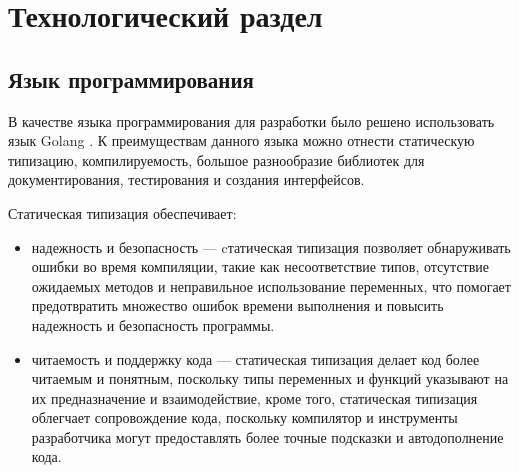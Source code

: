 \chapter{Технологический раздел}


\section{Язык программирования}

В качестве языка программирования для разработки  было решено использовать язык Golang \cite{golang}. К преимуществам данного языка можно отнести статическую типизацию, компилируемость, большое
разнообразие библиотек для документирования, тестирования и создания интерфейсов.

\begin{flushleft}
Статическая типизация обеспечивает:
\end{flushleft}
\begin{itemize}
\item надежность и безопасность --- cтатическая типизация позволяет обнаруживать ошибки во время компиляции, такие как несоответствие типов, отсутствие ожидаемых методов и неправильное использование переменных, что помогает предотвратить множество ошибок времени выполнения и повысить надежность и безопасность программы.

\item читаемость и поддержку кода --- статическая типизация делает код более читаемым и понятным, поскольку типы переменных и функций указывают на их предназначение и взаимодействие, кроме того, статическая типизация облегчает сопровождение кода, поскольку компилятор и инструменты разработчика могут предоставлять более точные подсказки и автодополнение кода.
\end{itemize}

%

